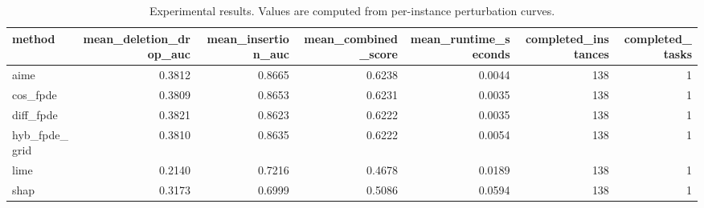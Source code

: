 \begin{table}[t]
\caption{Experimental results. Values are computed from per-instance perturbation curves.}
\label{tab:main_results_computed}
\centering
\begin{tabular}{lrrrrrr}
\toprule
method & mean\_deletion\_drop\_auc & mean\_insertion\_auc & mean\_combined\_score & mean\_runtime\_seconds & completed\_instances & completed\_tasks \\
\midrule
aime & 0.3812 & 0.8665 & 0.6238 & 0.0044 & 138 & 1 \\
cos\_fpde & 0.3809 & 0.8653 & 0.6231 & 0.0035 & 138 & 1 \\
diff\_fpde & 0.3821 & 0.8623 & 0.6222 & 0.0035 & 138 & 1 \\
hyb\_fpde\_grid & 0.3810 & 0.8635 & 0.6222 & 0.0054 & 138 & 1 \\
lime & 0.2140 & 0.7216 & 0.4678 & 0.0189 & 138 & 1 \\
shap & 0.3173 & 0.6999 & 0.5086 & 0.0594 & 138 & 1 \\
\bottomrule
\end{tabular}

\end{table}

